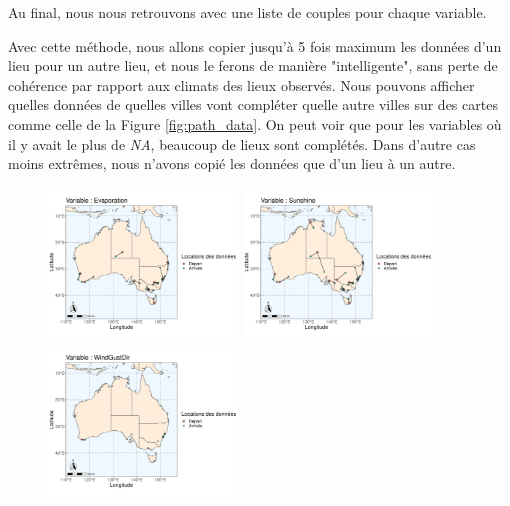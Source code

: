 \documentclass{article}
\begin{document}
Au final, nous nous retrouvons avec une liste de couples pour chaque variable.

Avec cette méthode, nous allons copier jusqu'à 5 fois maximum les données d'un lieu pour un autre lieu, et nous le ferons de manière "intelligente", sans perte de cohérence par rapport aux climats des lieux observés. Nous pouvons afficher quelles données de quelles villes vont compléter quelle autre villes sur des cartes comme celle de la Figure \ref{fig:path_data}. On peut voir que pour les variables où il y avait le plus de \emph{NA}, beaucoup de lieux sont complétés. Dans d'autre cas moins extrêmes, nous n'avons copié les données que d'un lieu à un autre. 

\begin{figure}[ht]
    \centering
    \includegraphics[width=0.45\textwidth]{Images/Australia_map_segments_complete/Australia_map_segments_complete-02.png}
    \includegraphics[width=0.45\textwidth]{Images/Australia_map_segments_complete/Australia_map_segments_complete-03.png}
    \includegraphics[width=0.45\textwidth]{Images/Australia_map_segments_complete/Australia_map_segments_complete-04.png}

\end{figure}
\end{document}
